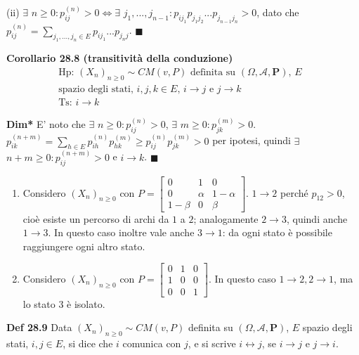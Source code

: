 \documentclass{article}
\begin{document}
(ii) $\exists $ $n\geq 0:p_{ij}^{\left( n\right) }>0\Longleftrightarrow
\exists $ $j_{1},...,j_{n-1}:p_{ij_{1}}p_{j_{1}j_{2}}...p_{j_{n-1}j_{n}}>0$,
dato che $p_{ij}^{\left( n\right) }=\sum_{j_{1},...,j_{n}\in
E}p_{ij_{1}}...p_{j_{n}j}$. $\blacksquare $

\textbf{Corollario 28.8 (transitivit\`{a} della conduzione)}%
\begin{gather*}
\text{Hp}\text{: }\left( X_{n}\right) _{n\geq 0}\sim CM\left( v,P\right) 
\text{ definita su }\left( \Omega ,\mathcal{A},\mathbf{P}\right) \text{, }E%
\text{ } \\
\text{spazio degli stati, }i,j,k\in E\text{, }i\rightarrow j\text{ e }%
j\rightarrow k \\
\text{Ts: }i\rightarrow k
\end{gather*}

\textbf{Dim* }E' noto che $\exists $ $n\geq 0:p_{ij}^{\left( n\right) }>0$, $%
\exists $ $m\geq 0:p_{jk}^{\left( m\right) }>0$. $p_{ik}^{\left( n+m\right)
}=\sum_{h\in E}p_{ih}^{\left( n\right) }p_{hk}^{\left( m\right) }\geq
p_{ij}^{\left( n\right) }p_{jk}^{\left( m\right) }>0$ per ipotesi, quindi $%
\exists $ $n+m\geq 0:p_{ij}^{\left( n+m\right) }>0$ e $i\rightarrow k$. $%
\blacksquare $

\begin{enumerate}
\item Considero $\left( X_{n}\right) _{n\geq 0}$ con $P=\left[ 
\begin{array}{ccc}
0 & 1 & 0 \\ 
0 & \alpha & 1-\alpha \\ 
1-\beta & 0 & \beta%
\end{array}%
\right] $. $1\rightarrow 2$ perch\'{e} $p_{12}>0$, cio\`{e} esiste un
percorso di archi da $1$ a $2$; analogamente $2\rightarrow 3$, quindi anche $%
1\rightarrow 3$. In questo caso inoltre vale anche $3\rightarrow 1$: da ogni
stato \`{e} possibile raggiungere ogni altro stato.

\item Considero $\left( X_{n}\right) _{n\geq 0}$ con $P=\left[ 
\begin{array}{ccc}
0 & 1 & 0 \\ 
1 & 0 & 0 \\ 
0 & 0 & 1%
\end{array}%
\right] $. In questo caso $1\rightarrow 2,2\rightarrow 1$, ma lo stato $3$ 
\`{e} isolato.
\end{enumerate}

\textbf{Def 28.9} Data $\left( X_{n}\right) _{n\geq 0}\sim CM\left(
v,P\right) $ definita su $\left( \Omega ,\mathcal{A},\mathbf{P}\right) $, $E$
spazio degli stati, $i,j\in E$, si dice che $i$ comunica con $j$, e si
scrive $i\leftrightarrow j$, se $i\rightarrow j$ e $j\rightarrow i$.
\end{document}
